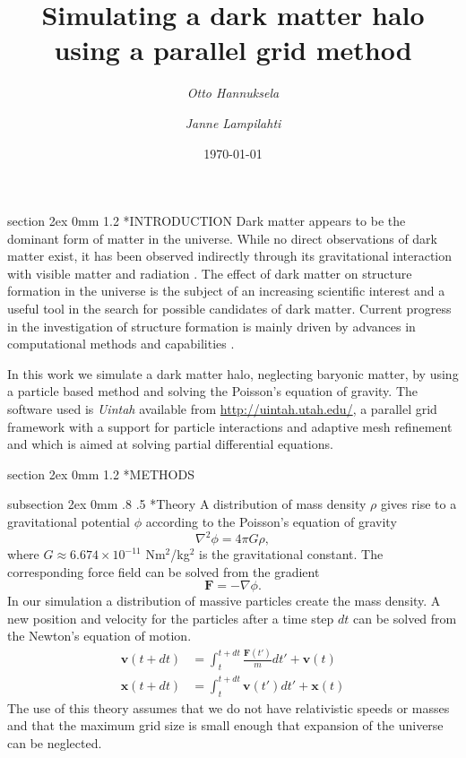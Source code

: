 \documentclass[notitlepage, 12pt]{article}
\title{Simulating a dark matter halo using a parallel grid method}
\author{{\em Otto Hannuksela} \and {\em Janne Lampilahti}}
\date{\today}
\makeatletter
\renewcommand{\section}{\@startsection       %
        {section}
        {2ex}
        {0mm}
        {1.2\baselineskip}
        {\baselineskip}
        {\centering\normalsize}}
\renewcommand{\subsection}{\@startsection    %
        {subsection}
        {2ex}
        {0mm}
        {.8\baselineskip}
        {.5\baselineskip}
        {\bfseries\normalsize}}
\makeatother
\begin{document}
\maketitle
\section*{INTRODUCTION}
Dark matter appears to be the dominant form of matter in the universe. While no direct observations of dark matter exist, it has been observed indirectly through its gravitational interaction with visible matter and radiation \citep{Roos2010}. The effect of dark matter on structure formation in the universe is the subject of an increasing scientific interest and a useful tool in the search for possible candidates of dark matter. Current progress in the investigation of structure formation is mainly driven by advances in computational methods and capabilities \citep{Kuhlen2012}. 

In this work we simulate a dark matter halo, neglecting baryonic matter, by using a particle based method and solving the Poisson's equation of gravity. The software used is {\em Uintah} available from \url{http://uintah.utah.edu/}, a parallel grid framework with a support for particle interactions and adaptive mesh refinement and which is aimed at solving partial differential equations.

\section*{METHODS}

\subsection*{Theory}
A distribution of mass density $\rho$ gives rise to a gravitational potential $\phi$ according to the Poisson's equation of gravity
\begin{equation}
\nabla^2 \phi = 4\pi G \rho,
\end{equation}
where $G\approx 6.674\times10^{-11}$ Nm$^2$/kg$^2$ is the gravitational constant. The corresponding force field can be solved from the gradient
\begin{equation}
\mathbf{F} = -\nabla \phi.
\end{equation}
In our simulation a distribution of massive particles create the mass density. A new position and velocity for the particles after a time step $dt$ can be solved from the Newton's equation of motion.
\begin{align}
\mathbf{v}(t+dt) &= \int_{t}^{t+dt}\frac{\mathbf{F}(t')}{m}dt' +  \mathbf{v}(t)\\
\mathbf{x}(t+dt) &= \int_{t}^{t+dt}\mathbf{v}(t')dt' +  \mathbf{x}(t)
\end{align}
The use of this theory assumes that we do not have relativistic speeds or masses and that the maximum grid size is small enough that expansion of the universe can be neglected.  
\end{document}

